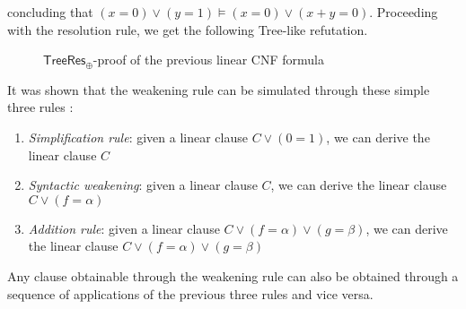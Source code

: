 concluding that $(x = 0) \lor (y = 1) \models (x = 0) \lor (x+y = 0)$. Proceeding with the resolution rule, we get the following Tree-like refutation.
\begin{figure}[H]
    \centering
    

    \caption{$\mathsf{TreeRes}_\oplus$-proof of the previous linear CNF formula}
    \label{treelike_proof}
\end{figure}

It was shown that the weakening rule can be simulated through these simple three rules \cite{res_lin_2}:
\begin{enumerate}
    \item \textit{Simplification rule}: given a linear clause $C \lor (0 = 1)$, we can derive the linear clause $C$
    \item \textit{Syntactic weakening}: given a linear clause $C$, we can derive the linear clause $C \lor (f = \alpha)$
    \item \textit{Addition rule}: given a linear clause $C \lor (f = \alpha) \lor (g = \beta)$, we can derive the linear clause $C \lor (f = \alpha) \lor (g = \beta)$
\end{enumerate}

\begin{proposition}
 Any clause obtainable through the weakening rule can also be obtained through a sequence of applications of the previous three rules and vice versa.
\end{proposition}

